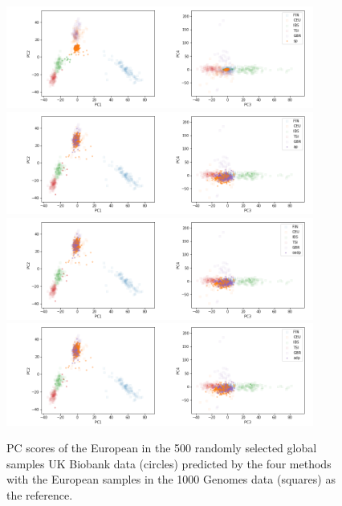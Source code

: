 \documentclass{article}
\begin{document}
\begin{figure}[p]
  \centering
  \includegraphics[width=0.9\textwidth]{img/ukb_snpscap_kgn_bial_orphans_5c_pred_EUR_sturef_kgn_bial_orphans_snps_ukb_snpscap_ukb_EUR_sp}
  \includegraphics[width=0.9\textwidth]{img/ukb_snpscap_kgn_bial_orphans_5c_pred_EUR_sturef_kgn_bial_orphans_snps_ukb_snpscap_ukb_EUR_ap}
  \includegraphics[width=0.9\textwidth]{img/ukb_snpscap_kgn_bial_orphans_5c_pred_EUR_sturef_kgn_bial_orphans_snps_ukb_snpscap_ukb_EUR_oadp}
  \includegraphics[width=0.9\textwidth]{img/ukb_snpscap_kgn_bial_orphans_5c_pred_EUR_sturef_kgn_bial_orphans_snps_ukb_snpscap_ukb_EUR_adp}
  \caption{PC scores of the European in the 500 randomly selected global samples UK Biobank data (circles) predicted by the four methods with the European samples in the 1000 Genomes data (squares) as the reference.}
  \label{fig:ukb_500_eur}
\end{figure}
\end{document}
